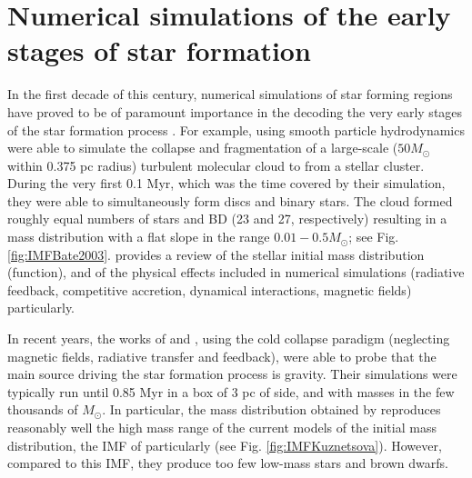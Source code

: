 \section{Numerical simulations of the early stages of star formation}
\label{sect:numerical_simulations}

In the first decade of this century, numerical simulations of star forming regions have proved to be of paramount importance in the decoding the very early stages of the star formation process \cite[e.g][]{2003MNRAS.339..577B,2005A&A...435..611J,2009MNRAS.392..590B,2009MNRAS.392.1363B,2009MNRAS.397..232B}. For example, \citet{2003MNRAS.339..577B} using smooth particle hydrodynamics were able to simulate the collapse and fragmentation of a large-scale ($50 M_{\odot}$ within 0.375 pc radius) turbulent molecular cloud to from a stellar cluster. During the very first 0.1 Myr, which was the time covered by their simulation, they were able to simultaneously form discs and binary stars. The cloud formed roughly equal numbers of stars and BD (23 and 27, respectively) resulting in a mass distribution with a flat slope in the range $0.01-0.5 M_{\odot}$; see Fig. \ref{fig:IMFBate2003}. \citet{Offner2014} provides a review of the stellar initial mass distribution (function), and of the physical effects included in numerical simulations (radiative feedback, competitive accretion, dynamical interactions, magnetic fields) particularly. 

In recent years, the works of \citet{2015ApJ...815...27K} and \citet{2015MNRAS.452..566B}, using the cold collapse paradigm (neglecting magnetic fields, radiative transfer and feedback), were able to probe that the main source driving the star formation process is gravity. Their simulations were typically run until 0.85 Myr in a box of 3 pc of side, and with masses in the few thousands of $M_{\odot}$. In particular, the mass distribution obtained by \citet{2015ApJ...815...27K} reproduces reasonably well the high mass range of the current models of the initial mass distribution, the IMF of \citet{Chabrier2005} particularly (see Fig. \ref{fig:IMFKuznetsova}). However, compared to this IMF, they produce too few low-mass stars and brown dwarfs.


